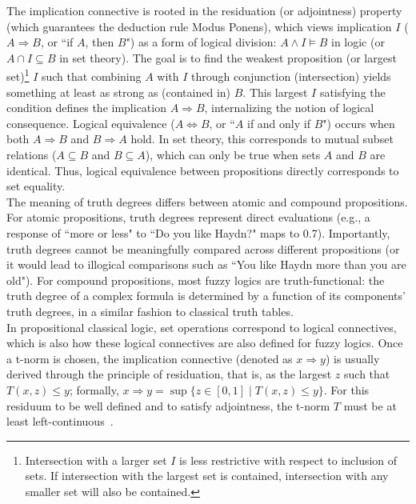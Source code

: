 The implication connective is rooted in the residuation (or adjointness) property (which guarantees the deduction rule Modus Ponens), which views implication $I$ ($A \Rightarrow B$, or ``if $A$, then $B$") as a form of logical division: $A \land I \models B$ in logic (or $A \cap I \subseteq B$ in set theory). The goal is to find the weakest proposition (or largest set)\footnote{Intersection with a larger set $I$ is less restrictive with respect to inclusion of sets. If intersection with the largest set is contained, intersection with any smaller set will also be contained.} $I$ such that combining $A$ with $I$ through conjunction (intersection) yields something at least as strong as (contained in) $B$. This largest $I$ satisfying the condition defines the implication $A \Rightarrow B$, internalizing the notion of logical consequence. Logical equivalence ($A \iff B$, or ``$A$ if and only if $B$") occurs when both $A \Rightarrow B$ and $B \Rightarrow A$ hold. In set theory, this corresponds to mutual subset relations ($A \subseteq B$ and $B \subseteq A$), which can only be true when sets $A$ and $B$ are identical. Thus, logical equivalence between propositions directly corresponds to set equality.\\

The meaning of truth degrees differs between atomic and compound propositions. For atomic propositions, truth degrees represent direct evaluations (e.g., a response of ``more or less" to ``Do you like Haydn?" maps to 0.7). Importantly, truth degrees cannot be meaningfully compared across different propositions (or it would lead to illogical comparisons such as ``You like Haydn more than you are old"). For compound propositions, most fuzzy logics are truth-functional: the truth degree of a complex formula is determined by a function of its components' truth degrees, in a similar fashion to classical truth tables.\\

In propositional classical logic, set operations correspond to logical connectives, which is also how these logical connectives are also defined for fuzzy logics. Once a t-norm is chosen, the implication connective (denoted as $x \Rightarrow y$) is usually derived through the principle of residuation, that is, as the largest $z$ such that $T(x, z) \le y$; formally, $x \Rightarrow y = \sup\{z \in [0,1] \mid T(x, z) \le y\}$. For this residuum to be well defined and to satisfy adjointness, the t-norm $T$ must be at least left-continuous~\cite[p.272]{GodoMonoidal}.\\


